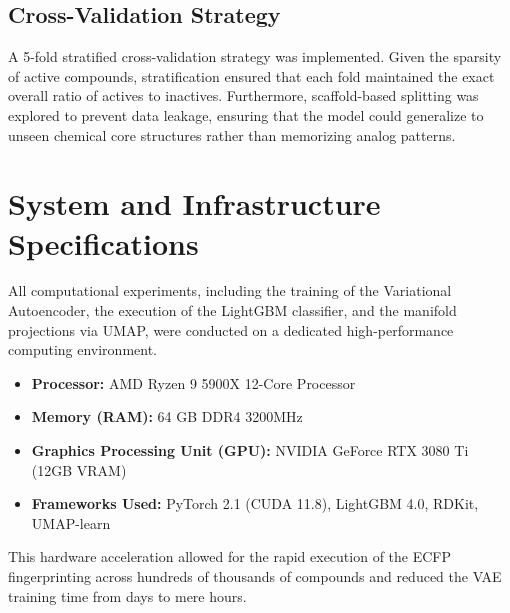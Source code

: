 \subsection{Cross-Validation Strategy}
A 5-fold stratified cross-validation strategy was implemented. Given the sparsity of active compounds, stratification ensured that each fold maintained the exact overall ratio of actives to inactives. Furthermore, scaffold-based splitting was explored to prevent data leakage, ensuring that the model could generalize to unseen chemical core structures rather than memorizing analog patterns.

\section{System and Infrastructure Specifications}

All computational experiments, including the training of the Variational Autoencoder, the execution of the LightGBM classifier, and the manifold projections via UMAP, were conducted on a dedicated high-performance computing environment. 

\begin{itemize}
    \item \textbf{Processor:} AMD Ryzen 9 5900X 12-Core Processor
    \item \textbf{Memory (RAM):} 64 GB DDR4 3200MHz
    \item \textbf{Graphics Processing Unit (GPU):} NVIDIA GeForce RTX 3080 Ti (12GB VRAM)
    \item \textbf{Frameworks Used:} PyTorch 2.1 (CUDA 11.8), LightGBM 4.0, RDKit, UMAP-learn
\end{itemize}

This hardware acceleration allowed for the rapid execution of the ECFP fingerprinting across hundreds of thousands of compounds and reduced the VAE training time from days to mere hours.

